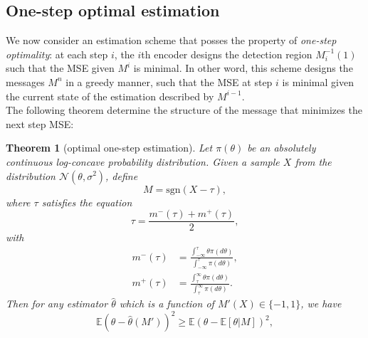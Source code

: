 \documentclass[letterpaper, conference,9pt]{IEEEtran}      %
\newtheorem{thm}{\bf{Theorem}}
\newcommand{\sgn}{\mathrm{sgn} }
\begin{document}
\subsection{One-step optimal estimation}
We now consider an estimation scheme that posses the property of \emph{one-step optimality}: at each step $i$, the $i$th encoder designs the detection region $M_i^{-1}(1)$ such that the MSE given $M^i$ is minimal. In other word, this scheme designs the messages $M^n$ in a greedy manner, such that the MSE at step $i$ is minimal given the current state of the estimation described by $M^{i-1}$. \\

The following theorem determine the structure of the message that minimizes the next step MSE:
\begin{thm}[optimal one-step estimation] \label{thm:opt_one_step}
Let $\pi(\theta)$ be an absolutely continuous log-concave probability distribution. Given a sample $X$ from the distribution $\mathcal N(\theta, \sigma^2)$, define 
\begin{equation}
\label{eq:adaptive_main_message}
M = \sgn(X - \tau),
\end{equation}
where $\tau$ satisfies the equation
\begin{equation}
 \label{eq:fixed_point}
 \tau = \frac{m^-(\tau) + m^+(\tau)}{2},
\end{equation}
with
\begin{align*}
m^-(\tau)  & = \frac{\int_{-\infty}^{\tau} \theta \pi(d\theta) }{\int_{-\infty}^{\tau} \pi(d\theta)} ,\\
m^+(\tau) & = \frac{\int_{\tau}^\infty \theta \pi(d\theta) }{\int_{\tau}^\infty \pi(d\theta)} .
\end{align*}
Then for any estimator $\widehat{\theta}$ which is a function of $M'(X) \in \{-1,1\}$, we have
\begin{equation}
\label{eq:opt_cond}
\mathbb E \left(\theta-\widehat{\theta}(M')\right)^2 \geq  \mathbb E \left(\theta- \mathbb E[\theta|M]\right)^2,
\end{equation}
\end{thm}
\end{document}
